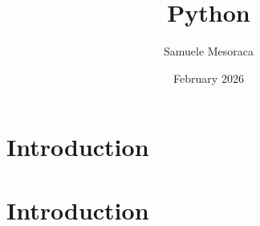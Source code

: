 \documentclass{article}
\title{Python}
\author{Samuele Mesoraca}
\date{February 2026}
\begin{document}
\maketitle

\section{Introduction}
\section{Introduction}
\end{document}
